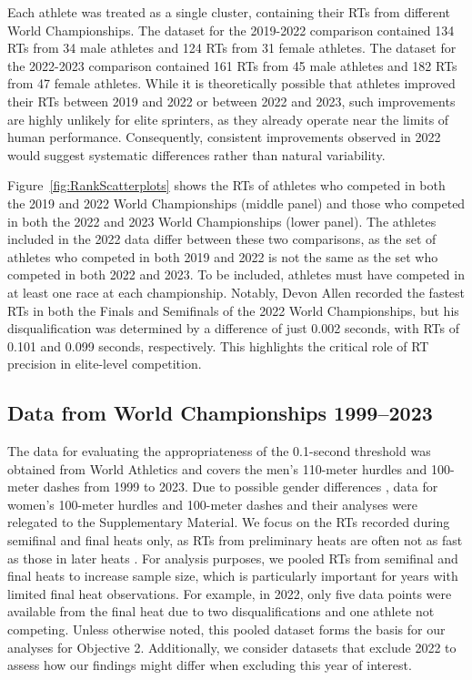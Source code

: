 \documentclass[12pt, letterpaper]{article}
\begin{document}
Each athlete was treated as a single cluster, containing their RTs
from different World Championships. The dataset for the 2019-2022
comparison contained 134 RTs from 34 male athletes and 124
RTs from 31 female athletes. The dataset for the 2022-2023
comparison contained 161 RTs from 45 male athletes and 182
RTs from 47 female athletes. While it is theoretically
possible that athletes improved their RTs between 2019 and
2022 or between 2022 and 2023, such improvements are highly unlikely for
elite sprinters, as they already operate near the limits of human
performance. Consequently, consistent improvements observed in 2022
would suggest systematic differences rather than natural variability.


Figure~\ref{fig:RankScatterplots} shows the RTs of athletes
who competed in both the 2019 and 2022 World Championships (middle
panel) and those who competed in both the 2022 and 2023 World
Championships (lower panel). The athletes included in the 2022 data
differ between these two comparisons, as the set of athletes who
competed in both 2019 and 2022 is not the same as the set who competed
in both 2022 and 2023. To be included, athletes must have competed in
at least one race at each championship. Notably, Devon Allen recorded
the fastest RTs in both the Finals and Semifinals of the
2022 World Championships, but his disqualification was determined by a
difference of just 0.002 seconds, with RTs of 0.101 and
0.099 seconds, respectively. This highlights the critical role of
RT precision in elite-level competition.


\subsection{Data from World Championships 1999--2023}
\label{sec:dataworld}

The data for evaluating the appropriateness of the 0.1-second
threshold was obtained from World Athletics and covers the men's
110-meter hurdles and 100-meter dashes from 1999 to 2023. Due to
possible gender differences \citep{babicc2009reaction,
  lipps2011implications}, data for women's 100-meter hurdles and
100-meter dashes and their analyses were relegated to the
Supplementary Material. We focus on the RTs recorded during
semifinal and final heats only, as RTs from preliminary
heats are often not as fast as those in later heats
\citep[e.g.,][]{collet1999strategic, tonnessen2013reaction,
  brosnan2017effects, zhang2021correlation}. For analysis purposes, we
pooled RTs from semifinal and final heats to increase sample
size, which is particularly important for years with limited final heat
observations. For example, in 2022, only five data points were available
from the final heat due to two disqualifications and one athlete not
competing. Unless otherwise noted, this pooled dataset forms the basis
for our analyses for Objective 2. Additionally, we consider datasets
that exclude 2022 to assess how our findings might differ when excluding
this year of interest.
\end{document}
